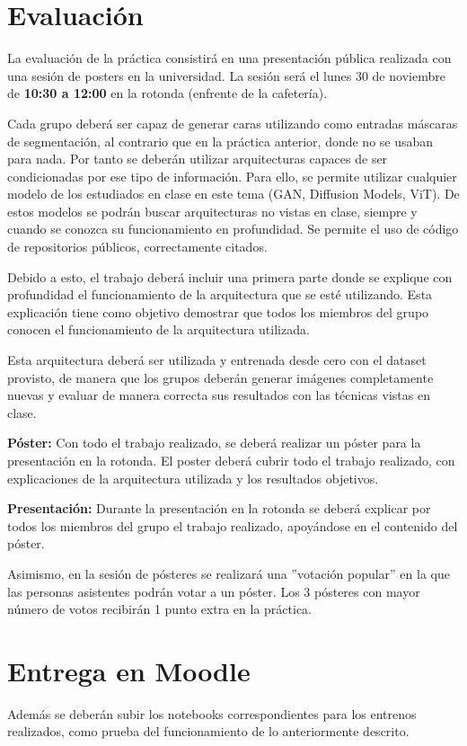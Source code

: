 \documentclass[a4paper]{article}
\begin{document}
\section{Evaluación}
La evaluación de la práctica consistirá en una presentación pública realizada con una sesión de posters en la universidad. La sesión será el lunes 30 de noviembre de \textbf{10:30 a 12:00} en la rotonda (enfrente de la cafetería).

Cada grupo deberá ser capaz de generar caras utilizando como entradas máscaras de segmentación, al contrario que en la práctica anterior, donde no se usaban para nada. Por tanto se deberán utilizar arquitecturas capaces de ser condicionadas por ese tipo de información. Para ello, se permite utilizar cualquier modelo de los estudiados en clase en este tema (GAN, Diffusion Models, ViT). De estos modelos se podrán buscar arquitecturas no vistas en clase, siempre y cuando se conozca su funcionamiento en profundidad. Se permite el uso de código de repositorios públicos, correctamente citados.

Debido a esto, el trabajo deberá incluir una primera parte donde se explique con profundidad el funcionamiento de la arquitectura que se esté utilizando. Esta explicación tiene como objetivo demostrar que todos los miembros del grupo conocen el funcionamiento de la arquitectura utilizada.

Esta arquitectura deberá ser utilizada y entrenada desde cero con el dataset provisto, de manera que los grupos deberán generar imágenes completamente nuevas y evaluar de manera correcta sus resultados con las técnicas vistas en clase.

\textbf{Póster:} Con todo el trabajo realizado, se deberá realizar un póster para la presentación en la rotonda. El poster deberá cubrir todo el trabajo realizado, con explicaciones de la arquitectura utilizada y los resultados objetivos.

\textbf{Presentación:} Durante la presentación en la rotonda se deberá explicar por todos los miembros del grupo el trabajo realizado, apoyándose en el contenido del póster.

Asimismo, en la sesión de pósteres se realizará una ''votación popular'' en la que las personas asistentes podrán votar a un póster. Los 3 pósteres con mayor número de votos recibirán 1 punto extra en la práctica.

\section{Entrega en Moodle}
Además se deberán subir los notebooks correspondientes para los entrenos realizados, como prueba del funcionamiento de lo anteriormente descrito.

\doclicenseThis
\end{document}
